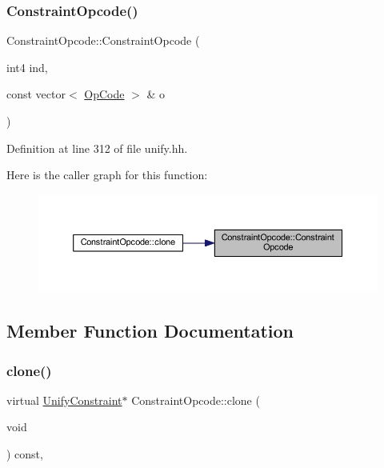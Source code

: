 \subsubsection{\texorpdfstring{ConstraintOpcode()}{ConstraintOpcode()}}
{\footnotesize\ttfamily Constraint\+Opcode\+::\+Constraint\+Opcode (\begin{DoxyParamCaption}\item[{int4}]{ind,  }\item[{const vector$<$ \mbox{\hyperlink{opcodes_8hh_abeb7dfb0e9e2b3114e240a405d046ea7}{Op\+Code}} $>$ \&}]{o }\end{DoxyParamCaption})\hspace{0.3cm}{\ttfamily [inline]}}



Definition at line 312 of file unify.\+hh.

Here is the caller graph for this function\+:
\nopagebreak
\begin{figure}[H]
\begin{center}
\leavevmode
\includegraphics[width=350pt]{class_constraint_opcode_a2debc0873db698c985ac75f422bf35f0_icgraph}
\end{center}
\end{figure}


\subsection{Member Function Documentation}
\mbox{\label{class_constraint_opcode_aaa3bc0e6cc446941be344459b962e2b6}} 
\subsubsection{\texorpdfstring{clone()}{clone()}}
{\footnotesize\ttfamily virtual \mbox{\hyperlink{class_unify_constraint}{Unify\+Constraint}}$\ast$ Constraint\+Opcode\+::clone (\begin{DoxyParamCaption}\item[{void}]{ }\end{DoxyParamCaption}) const\hspace{0.3cm}{\ttfamily [inline]}, {\ttfamily [virtual]}}



